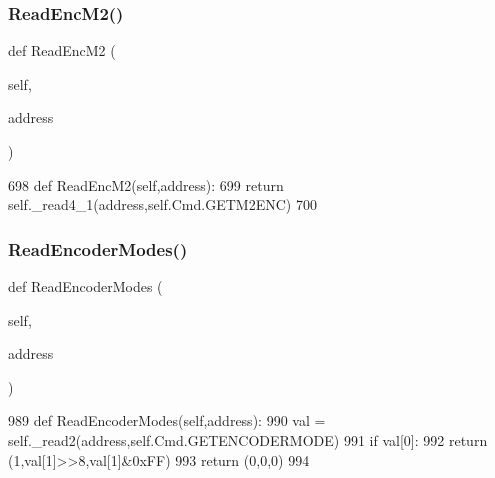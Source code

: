 \subsubsection{\texorpdfstring{Read\+Enc\+M2()}{ReadEncM2()}}
{\footnotesize\ttfamily def Read\+Enc\+M2 (\begin{DoxyParamCaption}\item[{}]{self,  }\item[{}]{address }\end{DoxyParamCaption})}


\begin{DoxyCode}
698     \textcolor{keyword}{def }ReadEncM2(self,address):
699         \textcolor{keywordflow}{return} self.\_read4\_1(address,self.Cmd.GETM2ENC)
700 
\end{DoxyCode}
\mbox{\label{classtoxic__hardware_1_1roboclaw__3_1_1Roboclaw_a1cef86af310cc021bdf421bd4d02adf3}} 
\subsubsection{\texorpdfstring{Read\+Encoder\+Modes()}{ReadEncoderModes()}}
{\footnotesize\ttfamily def Read\+Encoder\+Modes (\begin{DoxyParamCaption}\item[{}]{self,  }\item[{}]{address }\end{DoxyParamCaption})}


\begin{DoxyCode}
989     \textcolor{keyword}{def }ReadEncoderModes(self,address):
990         val = self.\_read2(address,self.Cmd.GETENCODERMODE)
991         \textcolor{keywordflow}{if} val[0]:
992             \textcolor{keywordflow}{return} (1,val[1]>>8,val[1]&0xFF)
993         \textcolor{keywordflow}{return} (0,0,0)
994         
\end{DoxyCode}
\mbox{\label{classtoxic__hardware_1_1roboclaw__3_1_1Roboclaw_a72e3c01c236d0507a5bbe51dbc4cab7c}} 
